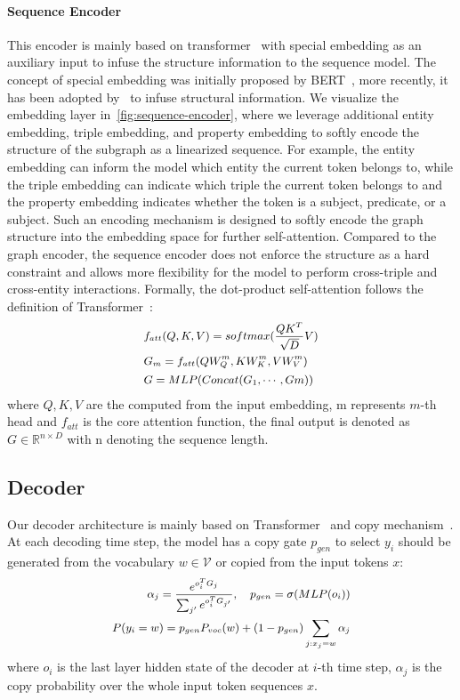 \documentclass[11pt,a4paper]{article}
\begin{document}
\paragraph{Sequence Encoder}
This encoder is mainly based on transformer~\cite{vaswani2017attention} with special embedding as an auxiliary input to infuse the structure information to the sequence model. The concept of special embedding was initially proposed by BERT~\cite{devlin2019bert}, more recently, it has been adopted by~\citet{herzig2020tapas} to infuse structural information. We visualize the embedding layer in~\autoref{fig:sequence-encoder}, where we leverage additional entity embedding, triple embedding, and property embedding to softly encode the structure of the subgraph as a linearized sequence. For example, the entity embedding can inform the model which entity the current token belongs to, while the triple embedding can indicate which triple the current token belongs to and the property embedding indicates whether the token is a subject, predicate, or a subject. Such an encoding mechanism is designed to softly encode the graph structure into the embedding space for further self-attention. Compared to the graph encoder, the sequence encoder does not enforce the structure as a hard constraint and allows more flexibility for the model to perform cross-triple and cross-entity interactions. Formally, the dot-product self-attention follows the definition of Transformer~\cite{vaswani2017attention}:
\begin{align}
\small
\begin{split}
    &f_{att}(Q, K, V) = softmax(\frac{QK^T}{\sqrt{D}}V)\\
    &G_m = f_{att}(QW_Q^m, KW_K^m, VW_V^m)\\
    &G = MLP(Concat(G_1, \cdots, Gm))
\end{split}
\end{align}
where $Q, K, V$ are the computed from the input embedding, m represents $m$-th head and $f_{att}$ is the core attention function, the final output is denoted as $G \in \mathbb{R}^{n \times D}$ with n denoting the sequence length.  

\subsection{Decoder}
Our decoder architecture is mainly based on Transformer~\cite{vaswani2017attention} and copy mechanism~\cite{see2017get}. At each decoding time step, the model has a copy gate $p_{gen}$ to select $y_i$ should be generated from the vocabulary $w \in \mathcal{V}$ or copied from the input tokens $x$:
\begin{align}
\small
\begin{split}
    \alpha_j = \frac{e^{o_i^T G_j}}{\sum_{j'} e^{o_{i}^T G_{j'}}}, \quad p_{gen} = \sigma(MLP(o_i)) \\
    P(y_i=w) = p_{gen} P_{voc}(w) + (1 - p_{gen}) \sum_{j:x_j = w} \alpha_j
\end{split}    
\end{align}
where $o_i$ is the last layer hidden state of the decoder at $i$-th time step, $\alpha_j$ is the copy probability over the whole input token sequences $x$. 
\end{document}
